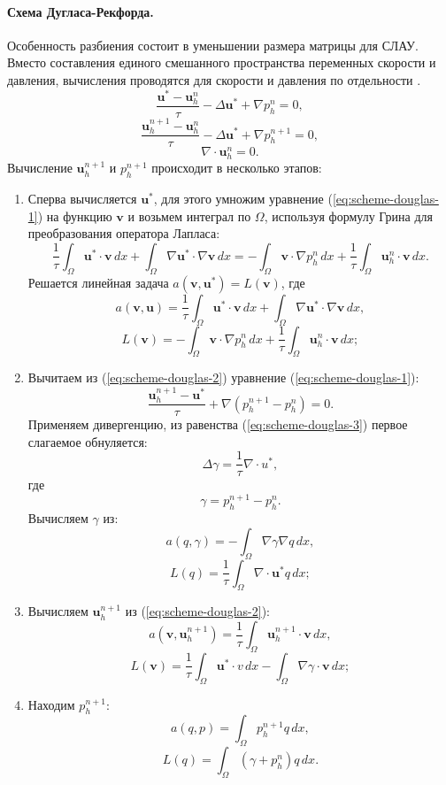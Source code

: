 \documentclass[12pt]{article}
\begin{document}
\paragraph{Схема Дугласа-Рекфорда.} Особенность разбиения состоит в уменьшении размера матрицы для СЛАУ. Вместо составления единого смешанного пространства переменных скорости и давления, вычисления проводятся для скорости и давления по отдельности \cite{vabishchevich-1999}. 
\begin{equation} \label{eq:scheme-douglas-1}
\frac{{\bm u}^{*}-{\bm u}_h^n}{\tau} - \Delta {\bm u}^{*}+{\nabla}p_h^n=0,
\end{equation}
\begin{equation} \label{eq:scheme-douglas-2}
\frac{{\bm u}_h^{n+1}-{\bm u}_h^n}{\tau} - \Delta {\bm u}^{*}+{\nabla}p_h^{n+1}=0,
\end{equation}
\begin{equation} \label{eq:scheme-douglas-3}
\nabla \cdot {\bm u}_h^n = 0.
\end{equation}
Вычисление ${\bm u}_h^{n+1}$ и $p_h^{n+1}$ происходит в несколько этапов:
\begin{enumerate}
\item 
Сперва вычисляется ${\bm u}^*$, для этого умножим уравнение (\ref{eq:scheme-douglas-1}) на функцию $\bm v$ и возьмем интеграл по $\Omega$, используя формулу Грина для преобразования оператора Лапласа:
$$
\frac{1}{\tau}\int_{\Omega} {\bm u}^*\cdot {\bm v} \,dx + \int_{\Omega} \nabla {\bm u}^* \cdot \nabla {\bm v} \,dx = -\int_{\Omega} {\bm v} \cdot \nabla p_h^{n}\, dx + \frac{1}{\tau} \int_{\Omega} {\bm u}_h^{n} \cdot {\bm v} \,dx.
$$
Решается линейная задача $a({\bm v}, {\bm u}^*) = L({\bm v})$, где
$$
a({\bm v}, {\bm u}) = \frac{1}{\tau}\int_{\Omega} {\bm u}^*\cdot {\bm v} \,dx + \int_{\Omega} \nabla {\bm u}^* \cdot \nabla {\bm v} \,dx,
$$
$$
L({\bm v}) = -\int_{\Omega} {\bm v} \cdot \nabla p_h^{n} \,dx + \frac{1}{\tau} \int_{\Omega} {\bm u}_h^{n} \cdot {\bm v} \,dx;
$$
\item 
Вычитаем из (\ref{eq:scheme-douglas-2}) уравнение (\ref{eq:scheme-douglas-1}):
\begin{equation} \label{eq:scheme-douglas-1}
\frac{{\bm u}_h^{n+1}-{\bm u}^*}{\tau} + {\nabla}(p_h^{n+1} - p_h^n )=0.
\end{equation}
Применяем дивергенцию, из равенства ({\ref{eq:scheme-douglas-3}}) первое слагаемое обнуляется:
$$
\Delta \gamma = \frac{1}{\tau} \nabla \cdot u^{*},
$$
где 
$$
\gamma = p_h^{n+1}-p_h^n.
$$
Вычисляем $\gamma$ из:
$$
a(q, \gamma) = -\int_{\Omega} \nabla \gamma \nabla q \,dx,
$$
$$
L(q) = \frac{1}{\tau} \int_{\Omega} \nabla \cdot {\bm u}^* q \,dx;
$$
\item 
Вычисляем ${\bm u}_h^{n+1}$ из (\ref{eq:scheme-douglas-2}):
$$
a({\bm v}, {\bm u}_h^{n+1}) = \frac{1}{\tau} \int_{\Omega} {\bm u}_h^{n+1} \cdot {\bm v}\,dx,
$$
$$
L({\bm v}) = \frac{1}{\tau} \int_{\Omega} {\bm u}^* \cdot v \,dx - \int_{\Omega} \nabla \gamma \cdot {\bm v} \,dx;
$$
\item 
Находим $p_h^{n+1}$:
$$
a(q, p) = \int_{\Omega} p_h^{n+1} q\,dx,
$$
$$
L(q) = \int_{\Omega} (\gamma + p_h^n) q\,dx.
$$
\end{enumerate}
\end{document}
